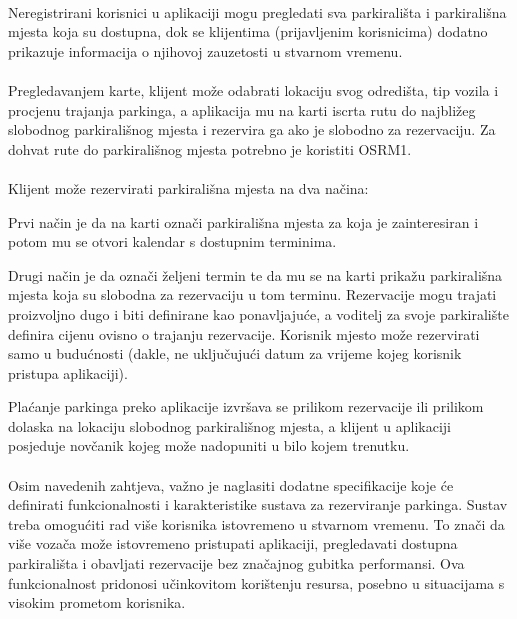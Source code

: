 \paragraph*{}{Neregistrirani korisnici u aplikaciji mogu pregledati sva parkirališta i parkirališna mjesta koja su dostupna, dok se klijentima (prijavljenim korisnicima) dodatno prikazuje informacija o njihovoj zauzetosti u stvarnom vremenu.}
\paragraph*{}{Pregledavanjem karte, klijent može odabrati lokaciju svog odredišta, tip vozila i procjenu trajanja parkinga, a aplikacija mu na karti iscrta rutu do najbližeg slobodnog parkirališnog mjesta i rezervira ga ako je slobodno za rezervaciju. Za dohvat rute do parkirališnog mjesta potrebno je koristiti OSRM1.}

\paragraph*{}Klijent može rezervirati parkirališna mjesta na dva načina:
\begin{packed_item}
	\item{
		Prvi način je da na karti označi parkirališna mjesta za koja je zainteresiran i potom mu se otvori kalendar s dostupnim terminima.
	}
	\item{
		Drugi način je da označi željeni termin te da mu se na karti prikažu parkirališna mjesta koja su slobodna za rezervaciju u tom terminu. Rezervacije mogu trajati proizvoljno dugo i biti definirane kao ponavljajuće, a voditelj za svoje parkiralište definira cijenu ovisno o trajanju rezervacije. Korisnik mjesto može rezervirati samo u budućnosti (dakle, ne uključujući datum za vrijeme kojeg korisnik pristupa aplikaciji).
	}
\end{packed_item}


Plaćanje parkinga preko aplikacije izvršava se prilikom rezervacije ili prilikom dolaska na lokaciju slobodnog parkirališnog mjesta, a klijent u aplikaciji posjeduje novčanik kojeg može nadopuniti u bilo kojem trenutku.


\paragraph*{}{Osim navedenih zahtjeva, važno je naglasiti dodatne specifikacije koje će definirati funkcionalnosti i karakteristike sustava za rezerviranje parkinga. Sustav treba omogućiti rad više korisnika istovremeno u stvarnom vremenu. To znači da više vozača može istovremeno pristupati aplikaciji, pregledavati dostupna parkirališta i obavljati rezervacije bez značajnog gubitka performansi. Ova funkcionalnost pridonosi učinkovitom korištenju resursa, posebno u situacijama s visokim prometom korisnika. }

